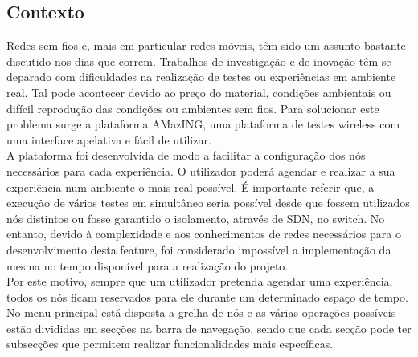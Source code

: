\subsection{Contexto}
Redes sem fios e, mais em particular redes móveis, têm sido um assunto bastante discutido nos dias que correm. Trabalhos de investigação e de inovação têm-se deparado com dificuldades na realização de testes ou experiências em ambiente real. Tal pode acontecer devido ao preço do material, condições ambientais ou difícil reprodução das condições ou ambientes sem fios. Para solucionar este problema surge a plataforma AMazING, uma plataforma de testes wireless com uma interface apelativa e fácil de utilizar.\newline\\
A plataforma foi desenvolvida de modo a facilitar a configuração dos nós necessários para cada experiência. O utilizador poderá agendar e realizar a sua experiência num ambiente o mais real possível.\newline
É importante referir que, a execução de vários testes em simultâneo seria possível desde que fossem utilizados nós distintos ou fosse garantido o isolamento, através de SDN, no switch. No entanto, devido à complexidade e aos conhecimentos de redes necessários para o desenvolvimento desta feature, foi considerado impossível a implementação da mesma no tempo disponível para a realização do projeto.\newline\\
Por este motivo, sempre que um utilizador pretenda agendar uma experiência, todos os nós ficam reservados para ele durante um determinado espaço de tempo. 
No menu principal está disposta a grelha de nós e as várias operações possíveis estão divididas em secções na barra de navegação, sendo que cada secção pode ter subsecções que permitem realizar funcionalidades mais específicas.


